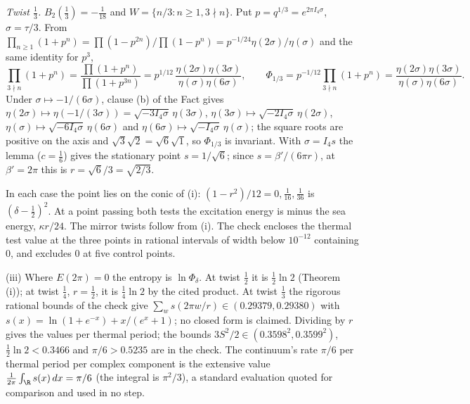 \emph{Twist $\tfrac13$.} $B_{2}(\tfrac13) = -\tfrac{1}{18}$ and $W = \{n/3 : n \ge 1, 3 \nmid n\}$. Put $p = q^{1/3} = e^{2\pi I_{4}\sigma}$, $\sigma = \tau/3$. From $\prod_{n \ge 1}(1 + p^{n}) = \prod(1 - p^{2n})/\prod(1 - p^{n}) = p^{-1/24}\eta(2\sigma)/\eta(\sigma)$ and the same identity for $p^{3}$,
\[
\prod_{3 \nmid n}(1 + p^{n}) = \frac{\prod(1 + p^{n})}{\prod(1 + p^{3n})} = p^{1/12}\,\frac{\eta(2\sigma)\eta(3\sigma)}{\eta(\sigma)\eta(6\sigma)}, \qquad \Phi_{1/3} = p^{-1/12}\prod_{3 \nmid n}(1 + p^{n}) = \frac{\eta(2\sigma)\eta(3\sigma)}{\eta(\sigma)\eta(6\sigma)}.
\]
Under $\sigma \mapsto -1/(6\sigma)$, clause (b) of the Fact gives $\eta(2\sigma) \mapsto \eta(-1/(3\sigma)) = \sqrt{-3I_{4}\sigma}\,\eta(3\sigma)$, $\eta(3\sigma) \mapsto \sqrt{-2I_{4}\sigma}\,\eta(2\sigma)$, $\eta(\sigma) \mapsto \sqrt{-6I_{4}\sigma}\,\eta(6\sigma)$ and $\eta(6\sigma) \mapsto \sqrt{-I_{4}\sigma}\,\eta(\sigma)$; the square roots are positive on the axis and $\sqrt{3}\sqrt{2} = \sqrt{6}\sqrt{1}$, so $\Phi_{1/3}$ is invariant. With $\sigma = I_{4}s$ the lemma ($c = \tfrac16$) gives the stationary point $s = 1/\sqrt{6}$; since $s = \beta'/(6\pi r)$, at $\beta' = 2\pi$ this is $r = \sqrt{6}/3 = \sqrt{2/3}$.

In each case the point lies on the conic of (i): $(1 - r^{2})/12 = 0, \tfrac{1}{16}, \tfrac{1}{36}$ is $(\delta - \tfrac12)^{2}$. At a point passing both tests the excitation energy is minus the sea energy, $\kappa r/24$. The mirror twists follow from (i). The check encloses the thermal test value at the three points in rational intervals of width below $10^{-12}$ containing $0$, and excludes $0$ at five control points.

(iii) Where $E(2\pi) = 0$ the entropy is $\ln\Phi_{\delta}$. At twist $\tfrac12$ it is $\tfrac12\ln 2$ (Theorem (i)); at twist $\tfrac14$, $r = \tfrac12$, it is $\tfrac14\ln 2$ by the cited product. At twist $\tfrac13$ the rigorous rational bounds of the check give $\sum_{w}s(2\pi w/r) \in (0.29379, 0.29380)$ with $s(x) = \ln(1 + e^{-x}) + x/(e^{x} + 1)$; no closed form is claimed. Dividing by $r$ gives the values per thermal period; the bounds $3S^{2}/2 \in (0.3598^{2}, 0.3599^{2})$, $\tfrac12\ln 2 < 0.3466$ and $\pi/6 > 0.5235$ are in the check. The continuum's rate $\pi/6$ per thermal period per complex component is the extensive value $\tfrac{1}{2\pi}\int_{\R}s(x)\,dx = \pi/6$ (the integral is $\pi^{2}/3$), a standard evaluation quoted for comparison and used in no step.

